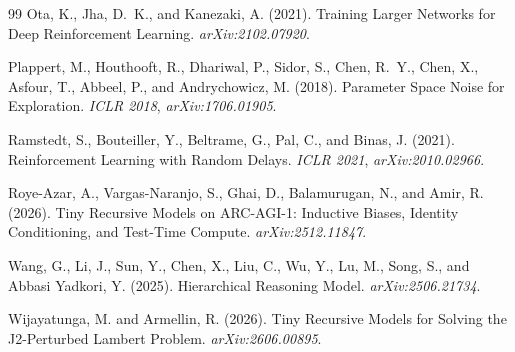 \documentclass[11pt]{article}
\begin{document}
\begin{thebibliography}{99}
Ota, K., Jha, D.~K., and Kanezaki, A. (2021).
\newblock Training Larger Networks for Deep Reinforcement Learning.
\newblock \emph{arXiv:2102.07920}.

Plappert, M., Houthooft, R., Dhariwal, P., Sidor, S., Chen, R.~Y., Chen, X., Asfour, T., Abbeel, P., and Andrychowicz, M. (2018).
\newblock Parameter Space Noise for Exploration.
\newblock \emph{ICLR 2018}, \emph{arXiv:1706.01905}.

Ramstedt, S., Bouteiller, Y., Beltrame, G., Pal, C., and Binas, J. (2021).
\newblock Reinforcement Learning with Random Delays.
\newblock \emph{ICLR 2021}, \emph{arXiv:2010.02966}.

Roye-Azar, A., Vargas-Naranjo, S., Ghai, D., Balamurugan, N., and Amir, R. (2026).
\newblock Tiny Recursive Models on ARC-AGI-1: Inductive Biases, Identity Conditioning, and Test-Time Compute.
\newblock \emph{arXiv:2512.11847}.

Wang, G., Li, J., Sun, Y., Chen, X., Liu, C., Wu, Y., Lu, M., Song, S., and Abbasi Yadkori, Y. (2025).
\newblock Hierarchical Reasoning Model.
\newblock \emph{arXiv:2506.21734}.

Wijayatunga, M. and Armellin, R. (2026).
\newblock Tiny Recursive Models for Solving the J2-Perturbed Lambert Problem.
\newblock \emph{arXiv:2606.00895}.

\end{thebibliography}
\end{document}
